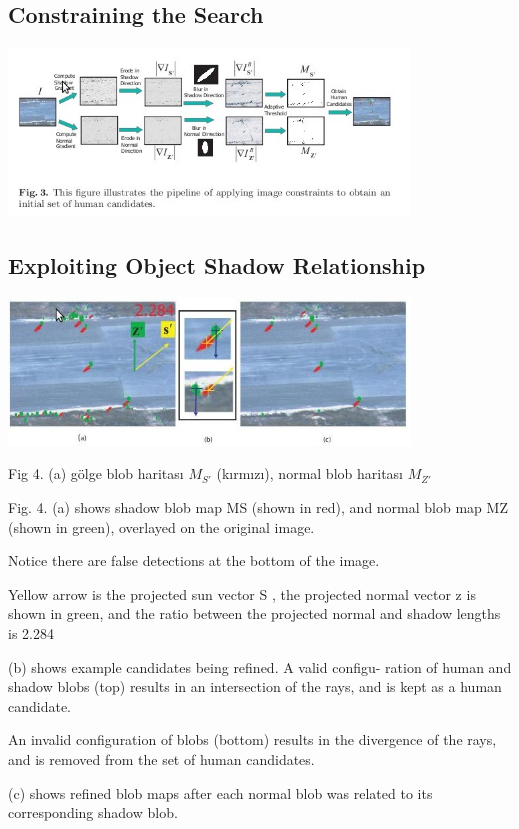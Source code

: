 \documentclass{beamer}
\begin{document}
\subsection{Constraining the Search}

\begin{frame}
	\includegraphics[width=0.8\textwidth]{img/fig3.jpg}
\end{frame}

\subsection{Exploiting Object Shadow Relationship}

\begin{frame}[allowframebreaks]
	\includegraphics[width=0.8\textwidth]{img/fig4.jpg}

	\begin{scriptsize}
	Fig 4. (a) gölge blob haritası $M_{S'}$ (kırmızı), normal blob haritası
	$M_{Z'}$

Fig. 4. (a) shows shadow blob map MS (shown in red), and normal blob map MZ
(shown in green), overlayed on the original image.

Notice there are false detections at the bottom of the image.

Yellow arrow is the projected sun vector S , the projected normal vector z is
shown in green, and the ratio between the projected normal and shadow lengths is
2.284

(b) shows example candidates being refined.  A valid configu- ration of human
and shadow blobs (top) results in an intersection of the rays, and is kept as a
human candidate.

An invalid configuration of blobs (bottom) results in the divergence of the
rays, and is removed from the set of human candidates.

(c) shows refined blob maps after each normal blob was related to its
corresponding shadow blob.

	\end{scriptsize}
\end{frame}
\end{document}
